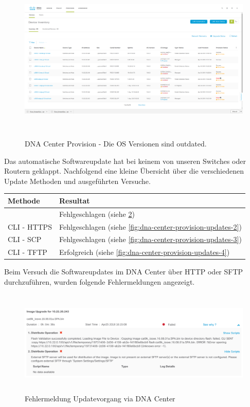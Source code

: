 \begin{figure}[H]
	\centering
	\includegraphics[height=8cm]{img/updates/Selection_070.png}
	\caption{DNA Center Provision - Die OS Versionen sind outdated.}
	\label{fig:dna-center-provision-updates}
\end{figure}

Das automatische Softwareupdate hat bei keinem von unseren Switches oder Routern geklappt. Nachfolgend eine kleine Übersicht über die verschiedenen Update Methoden und ausgeführten Versuche.

\begin{tabular}{ | l | l |}
	\hline
	\textbf{Methode} & \textbf{Resultat} \\
	\hline	
	\makecell{DNA Center über HTTP und SFTP} & Fehlgeschlagen (siehe \ref{fig:dna-center-provision-updates-1}) \\
	CLI - HTTPS    & Fehlgeschlagen (siehe \ref{fig:dna-center-provision-updates-2}) \\
	CLI - SCP      & Fehlgeschlagen (siehe \ref{fig:dna-center-provision-updates-3}) \\
	CLI - TFTP     & Erfolgreich (siehe \ref{fig:dna-center-provision-updates-4}) \\	
	\hline
\end{tabular}

Beim Versuch die Softwareupdates im DNA Center über HTTP oder SFTP durchzuführen, wurden folgende Fehlermeldungen angezeigt.

\begin{figure}[H]
	\centering
	\includegraphics[height=5cm]{img/updates/Selection_071.png}
	\caption{Fehlermeldung Updatevorgang via DNA Center}
	\label{fig:dna-center-provision-updates-1}
\end{figure}

